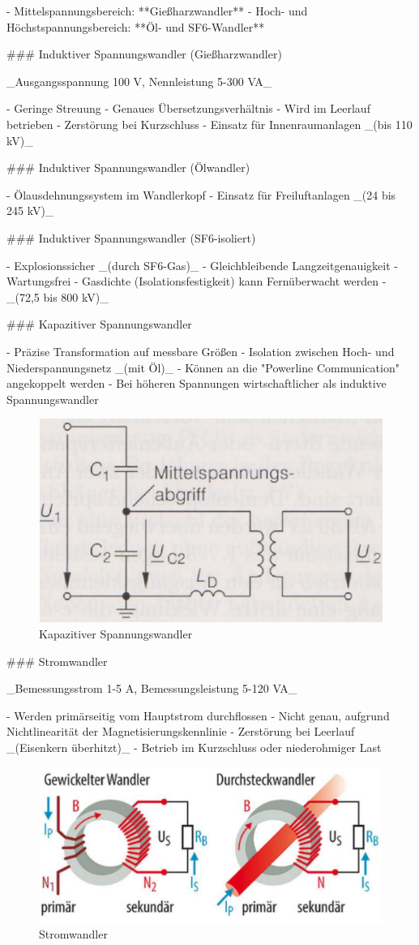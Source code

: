\begin{markdown}
- Mittelspannungsbereich: **Gießharzwandler**
- Hoch- und Höchstspannungsbereich: **Öl- und SF6-Wandler** 

\newpage

### Induktiver Spannungswandler (Gießharzwandler)

_Ausgangsspannung 100 V, Nennleistung 5-300 VA_

- Geringe Streuung
- Genaues Übersetzungsverhältnis
- Wird im Leerlauf betrieben
- Zerstörung bei Kurzschluss
- Einsatz für Innenraumanlagen _(bis 110 kV)_

### Induktiver Spannungswandler (Ölwandler)

- Ölausdehnungssystem im Wandlerkopf
- Einsatz für Freiluftanlagen _(24 bis 245 kV)_

### Induktiver Spannungswandler (SF6-isoliert)

- Explosionssicher _(durch SF6-Gas)_
- Gleichbleibende Langzeitgenauigkeit
- Wartungsfrei
- Gasdichte (Isolationsfestigkeit) kann Fernüberwacht werden
- _(72,5 bis 800 kV)_

### Kapazitiver Spannungswandler

- Präzise Transformation auf messbare Größen
- Isolation zwischen Hoch- und Niederspannungsnetz _(mit Öl)_
- Können an die "Powerline Communication" angekoppelt werden
- Bei höheren Spannungen wirtschaftlicher als induktive Spannungswandler

\begin{figure}[H]
    \centering
    \includegraphics[width=0.4\linewidth]{./images/10-Schaltanlagen/Spannungswandler-Kapazitiv.png}
    \caption[Kapazitiver Spannungswandler]{Kapazitiver Spannungswandler}
\end{figure}

### Stromwandler

_Bemessungsstrom 1-5 A, Bemessungsleistung 5-120 VA_

- Werden primärseitig vom Hauptstrom durchflossen
- Nicht genau, aufgrund Nichtlinearität der Magnetisierungskennlinie
- Zerstörung bei Leerlauf _(Eisenkern überhitzt)_
- Betrieb im Kurzschluss oder niederohmiger Last

\begin{figure}[H]
    \centering
    \includegraphics[width=0.6\linewidth]{./images/10-Schaltanlagen/Stromwandler.png}
    \caption[Stromwandler]{Stromwandler}
\end{figure}


\end{markdown}
